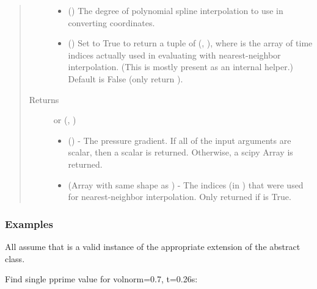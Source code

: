 \documentclass[letterpaper,10pt,english]{sphinxmanual}
\begin{document}
\begin{fulllineitems}
\begin{fulllineitems}
\begin{quote}
\begin{description}
\begin{itemize}
\item {} 
 () \textendash{} The degree of polynomial spline interpolation to
use in converting coordinates.

\item {} 
 () \textendash{} Set to True to return a tuple of (,
), where  is the array of time indices
actually used in evaluating  with nearest-neighbor
interpolation. (This is mostly present as an internal helper.)
Default is False (only return ).

\end{itemize}

\item[{Returns}] \leavevmode

 or (, )
\begin{itemize}
\item {} 
 () - The pressure gradient. If
all of the input arguments are scalar, then a scalar is returned.
Otherwise, a scipy Array is returned.

\item {} 
 (Array with same shape as ) - The indices
(in ) that were used for
nearest-neighbor interpolation. Only returned if  is
True.

\end{itemize}


\end{description}\end{quote}
\subsubsection*{Examples}

All assume that  is a valid instance of the appropriate
extension of the {\hyperref[\detokenize{eqtools:eqtools.core.Equilibrium}]{}} abstract class.

Find single pprime value for volnorm=0.7, t=0.26s:


\end{fulllineitems}
\end{fulllineitems}
\end{document}
